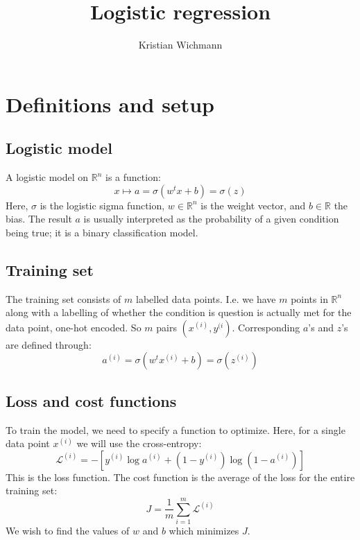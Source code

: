 \documentclass[12pt, a4paper]{article}
\title{Logistic regression}
\author{Kristian Wichmann}
\numberwithin{equation}{section}
\begin{document}
\maketitle

\section{Definitions and setup}

\subsection{Logistic model}
A logistic model on $\mathbb{R}^n$ is a function:
\begin{equation}
x\mapsto a=\sigma(w^t x+b)=\sigma(z)
\end{equation}
Here, $\sigma$ is the logistic sigma function, $w\in\mathbb{R}^n$ is the weight vector, and $b\in\mathbb{R}$ the bias. The result $a$ is usually interpreted as the probability of a given condition being true; it is a binary classification model.

\subsection{Training set}
The training set consists of $m$ labelled data points. I.e. we have $m$ points in $\mathbb{R}^n$ along with a labelling of whether the condition is question is actually met for the data point, one-hot encoded. So $m$ pairs $(x^{(i)},y^{(i})$. Corresponding $a$'s and $z$'s are defined through:
\begin{equation}
a^{(i)}=\sigma(w^t x^{(i)}+b)=\sigma(z^{(i)})
\end{equation}

\subsection{Loss and cost functions}
To train the model, we need to specify a function to optimize. Here, for a single data point $x^{(i)}$ we will use the cross-entropy:
\begin{equation}
\mathcal{L}^{(i)}=-\left[y^{(i)}\log a^{(i)}+(1-y^{(i)})\log(1-a^{(i)})\right]
\end{equation}
This is the loss function. The cost function is the average of the loss for the entire training set:
\begin{equation}
J=\frac{1}{m}\sum_{i=1}^m\mathcal{L}^{(i)}
\end{equation}
We wish to find the values of $w$ and $b$ which minimizes $J$.
\end{document}
